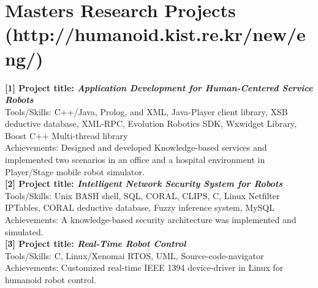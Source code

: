 \documentclass[notopicbreak,contbibnum,plain]{simplecv}
\begin{document}
\section{\textbf{Masters Research Projects} (http://humanoid.kist.re.kr/new/eng/)}
\vspace*{-0.3cm}
\textbf{[1] Project title: \textit{Application Development for Human-Centered Service Robots}}\\
Tools/Skills: C++/Java, Prolog, and XML, Java-Player client library, XSB deductive database, XML-RPC, Evolution Robotics SDK, Wxwidget Library, Boost C++ Multi-thread library\\
Achievements: Designed and developed Knowledge-based services and implemented two scenarios in an office and a hospital environment in Player/Stage mobile robot simulator.\\
\textbf{[2] Project title: \textit{Intelligent Network Security System for Robots}}\\
Tools/Skills: Unix BASH shell, SQL, CORAL, CLIPS, C, Linux Netfilter IPTables, CORAL deductive database, Fuzzy inference system, MySQL\\
Achievements: A knowledge-based security architecture was implemented and simulated.\\
\textbf{[3] Project title:\textit{ Real-Time Robot Control}}\\
Tools/Skills: C, Linux/Xenomai RTOS, UML, Source-code-navigator\\
Achievements: Customized real-time IEEE 1394 device-driver in Linux for humanoid robot control.
\vspace*{-0.3cm}
\end{document}
